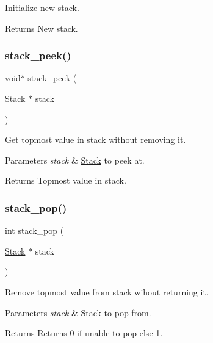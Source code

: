 Initialize new stack. 

\begin{DoxyReturn}{Returns}
New stack. 
\end{DoxyReturn}
\mbox{\label{group__Stack_ga6c01cb19646f8f9134032e08fd63133a}} 
\subsubsection{\texorpdfstring{stack\+\_\+peek()}{stack\_peek()}}
{\footnotesize\ttfamily void$\ast$ stack\+\_\+peek (\begin{DoxyParamCaption}\item[{\hyperlink{structStack}{Stack} $\ast$}]{stack }\end{DoxyParamCaption})}



Get topmost value in stack without removing it. 


\begin{DoxyParams}{Parameters}
{\em stack} & \hyperlink{structStack}{Stack} to peek at. \\
\hline
\end{DoxyParams}
\begin{DoxyReturn}{Returns}
Topmost value in stack. 
\end{DoxyReturn}
\mbox{\label{group__Stack_ga86914bce7c52639297c92a086ba87581}} 
\subsubsection{\texorpdfstring{stack\+\_\+pop()}{stack\_pop()}}
{\footnotesize\ttfamily int stack\+\_\+pop (\begin{DoxyParamCaption}\item[{\hyperlink{structStack}{Stack} $\ast$}]{stack }\end{DoxyParamCaption})}



Remove topmost value from stack wihout returning it. 


\begin{DoxyParams}{Parameters}
{\em stack} & \hyperlink{structStack}{Stack} to pop from. \\
\hline
\end{DoxyParams}
\begin{DoxyReturn}{Returns}
Returns 0 if unable to pop else 1. 
\end{DoxyReturn}
\mbox{\label{group__Stack_gad1986611f7a858ac370254eb4a2a1580}} 
